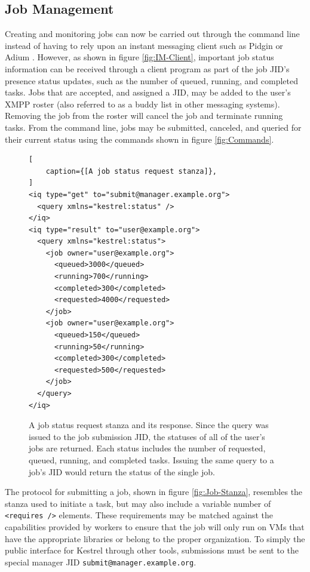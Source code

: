 \subsection{Job Management}
\label{sec:Job-Management} 
Creating and monitoring jobs can now
be carried out through the command line instead of having to rely
upon an instant messaging client such as Pidgin \cite{Pidgin} or
Adium \cite{Adium}. However, as shown in figure \ref{fig:IM-Client},
important job status information can be received through a client
program as part of the job JID's presence status updates, such as
the number of queued, running, and completed tasks. Jobs that are
accepted, and assigned a JID, may be added to the user's XMPP roster
(also referred to as a buddy list in other messaging systems). Removing
the job from the roster will cancel the job and terminate running
tasks. From the command line, jobs may be submitted, canceled, and
queried for their current status using the commands shown in figure
\ref{fig:Commands}.

\begin{figure}
\begin{lstlisting}[
    caption={[A job status request stanza]},
]
<iq type="get" to="submit@manager.example.org"> 
  <query xmlns="kestrel:status" /> 
</iq>
<iq type="result" to="user@example.org"> 
  <query xmlns="kestrel:status"> 
    <job owner="user@example.org"> 
      <queued>3000</queued> 
      <running>700</running> 
      <completed>300</completed> 
      <requested>4000</requested> 
    </job>
    <job owner="user@example.org"> 
      <queued>150</queued> 
      <running>50</running> 
      <completed>300</completed> 
      <requested>500</requested> 
    </job>
  </query> 
</iq>
\end{lstlisting}
\label{fig:Status-Stanza}
\caption{A job status request stanza and its response.
Since the query was issued to the job submission JID, the statuses
of all of the user's jobs are returned. Each status includes the number
of requested, queued, running, and completed tasks. Issuing the same
query to a job's JID would return the status of the single job.}
\end{figure}

The protocol for submitting a job, shown in figure \ref{fig:Job-Stanza},
resembles the stanza used to initiate a task, but may also include
a variable number of \texttt{<requires />} elements. These requirements
may be matched against the capabilities provided by workers to ensure
that the job will only run on VMs that have the appropriate libraries
or belong to the proper organization. To simply the public interface
for Kestrel through other tools, submissions must be sent to the special
manager JID \texttt{submit@manager.example.org}.


